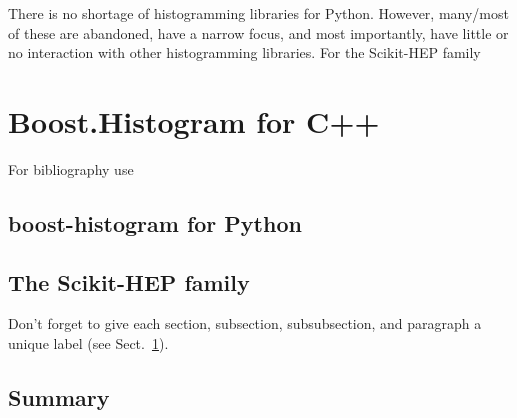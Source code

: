\documentclass{webofc}
\begin{document}
There is no shortage of histogramming libraries for Python. However, many/most of these are abandoned, have a narrow focus, and most importantly, have little or no interaction with other histogramming libraries. For the Scikit-HEP family 

\section{Boost.Histogram for C++}
\label{sec-1}

For bibliography use \cite{RefJ}

\subsection{boost-histogram for Python}
\label{sec-2}

\subsection{The Scikit-HEP family}
\label{sec-3}

Don't forget to give each section, subsection, subsubsection, and
paragraph a unique label (see Sect.~\ref{sec-1}).

\subsection{Summary}
\label{sec-4}

% 
\end{document}
